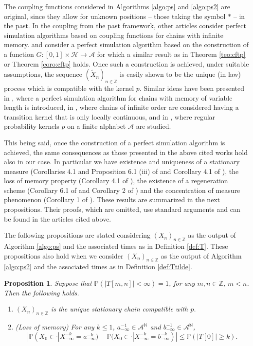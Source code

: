 \documentclass[a4paper]{article}
\newtheorem{proposition}{Proposition}%
\def\P{{\mathbb P}}
\newcommand{\Z}{\mathbb{Z}}
\newcommand{\N}{\mathbb{N}}
\renewcommand{\H}{\mathcal{H}}
\newcommand{\A}{\mathcal{A}}
\begin{document}
The coupling functions considered in Algorithms \ref{algo:ps} and \ref{algo:ps2} are original, since they allow for unknown positions -- those taking the symbol $*$ -- in the past.  
In the coupling from the past framework, other articles consider perfect simulation algorithms based on coupling functions for chains with infinite memory. \cite{cff} and \cite{desantispiccioni}
consider a perfect simulation algorithm based on the construction of a function
$
G:[0,1]\times \H \to \A
$
for which a similar result as in Theorem \ref{teo:cftp} or Theorem \ref{coro:cftp} holds. Once such a construction is achieved, under suitable assumptions, the sequence $(\tilde{X}_n)_{n\in \Z}$ is easily shown to be the unique (in law) process which is compatible with the kernel $p$. Similar ideas have been presented in \cite{gallo}, where a perfect simulation algorithm for chains with memory of variable length is introduced, 
in \cite{gallogarcia}, where chains of infinite order are considered having a transition kernel that is only locally continuous, and in \cite{gallotakahashi}, where regular probability kernels $p$ on a finite alphabet $\A$ are studied. 

This being said, once the construction of a perfect simulation algorithm is achieved, the same consequences as those presented in the above cited works hold also in our case.  In particular we have existence and uniqueness of a stationary measure (Corollaries 4.1 and 
Proposition 6.1 (iii) of \cite{cff} and Corollary 4.1 of \cite{gallogarcia}), the loss of memory property (Corollary 4.1 of \cite{cff}), the existence of a regeneration scheme (Corollary 6.1 of \cite{cff} and Corollary 2 of \cite{gallo}) and the concentration of measure phenomenon (Corollary 1 of \cite{gallotakahashi}).
These results are summarized in the next propositions. Their proofs, which are omitted, use standard arguments and can be found in the articles cited above.

The following propositions are stated considering $(X_n)_{n\in \Z}$ as the output of Algorithm \ref{algo:ps} and the associated times as in Definition \ref{def:T}. These propositions also hold when we consider $(X_n)_{n\in \Z}$ as the output of Algorithm \ref{algo:ps2} and the associated times as in Definition \ref{def:Ttilde}.


\begin{proposition} \label{prop:consequences}
Suppose that $\P(|T[m,n]|<\infty)=1$, for any $m,n \in \Z$, $m<n$. Then the following holds.
\begin{enumerate}
\item $(X_n)_{n\in \Z}$ is the unique stationary chain compatible with $p$.  
\item (Loss of memory) For any $k\leq 1$, $a^{-1}_{-\infty}\in \A^{\N}$ and $b^{-1}_{-\infty}\in \A^{\N}$,
$$
|\P(X_0 \in \cdot |X_{-\infty}^{-k}=a^{-k}_{-\infty}) -\P(X_0 \in \cdot |X_{-\infty}^{-k}=b^{-k}_{-\infty})| \leq \P(|T[0]|\geq  k).
$$
\end{enumerate}
    
\end{proposition}
\end{document}
